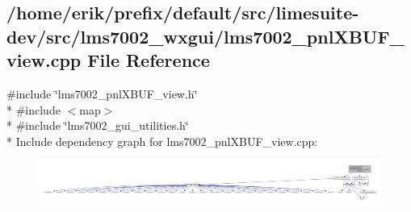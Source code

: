\subsection{/home/erik/prefix/default/src/limesuite-\/dev/src/lms7002\+\_\+wxgui/lms7002\+\_\+pnl\+X\+B\+U\+F\+\_\+view.cpp File Reference}
\label{lms7002__pnlXBUF__view_8cpp}
{\ttfamily \#include \char`\"{}lms7002\+\_\+pnl\+X\+B\+U\+F\+\_\+view.\+h\char`\"{}}\\*
{\ttfamily \#include $<$map$>$}\\*
{\ttfamily \#include \char`\"{}lms7002\+\_\+gui\+\_\+utilities.\+h\char`\"{}}\\*
Include dependency graph for lms7002\+\_\+pnl\+X\+B\+U\+F\+\_\+view.\+cpp\+:
\nopagebreak
\begin{figure}[H]
\begin{center}
\leavevmode
\includegraphics[width=350pt]{db/dc6/lms7002__pnlXBUF__view_8cpp__incl}
\end{center}
\end{figure}
